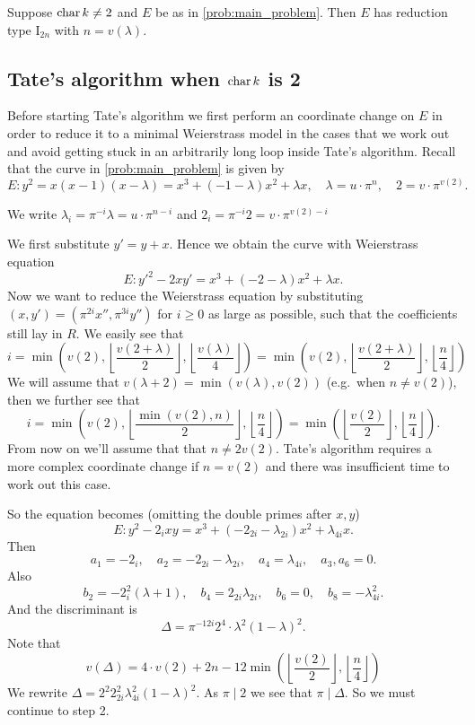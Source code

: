 \begin{proposition}
	Suppose $\operatorname{char} k \ne 2$ and $E$ be as in \cref{prob:main_problem}. 
	Then $E$ has reduction type $\mathrm I_{2n}$ with $n = v(\lambda)$. 
\end{proposition}

\subsection{Tate's algorithm when $\operatorname{char} k$ is 2}  \label{sec:char_k_is_2}

Before starting Tate's algorithm we first perform an coordinate change on $E$ in order to reduce it to a minimal Weierstrass model in the cases that we work out and avoid getting stuck in an arbitrarily long loop inside Tate's algorithm. 
Recall that the curve in \cref{prob:main_problem} is given by \[
	E: y^2 = x(x-1)(x-\lambda) = x^3 + (-1 -\lambda) x^2 + \lambda x, \quad \lambda = u \cdot \pi^{n}, \quad 2 = v\cdot \pi^{v(2)}
.\] 
\begin{notation}
	We write $\lambda_i = \pi^{-i} \lambda = u\cdot \pi ^{n -i}$ and $2_i = \pi^{-i}2 = v \cdot \pi^{v(2) - i}$
\end{notation}
We first substitute $y' = y + x$. 
Hence we obtain the curve with Weierstrass equation \[
	E: y'^2 - 2xy' = x^3 + (-2-\lambda) x^2 + \lambda x
.\] 
Now we want to reduce the Weierstrass equation by substituting $(x, y') = (\pi^{2i} x'', \pi^{3i}y'')$ for $i \ge 0$ as large as possible, such that the coefficients still lay in $R$. 
We easily see that \[
	i =  \min\left(v(2), \left\lfloor \frac{v(2 + \lambda)}{2} \right\rfloor,  \left\lfloor \frac{v(\lambda)}{4} \right\rfloor\right) = \min\left(v(2), \left\lfloor \frac{v(2 + \lambda)}{2} \right\rfloor,  \left\lfloor \frac{n}{4} \right\rfloor\right) 
\]
We will assume that $v(\lambda + 2) = \min(v(\lambda), v(2))$ (e.g.\ when $n \ne v(2)$), then we further see that \[
	i = \min\left(v(2), \left\lfloor \frac{\min (v(2), n)}{2} \right\rfloor,  \left\lfloor \frac{n}{4} \right\rfloor\right)  = \min\left(\left\lfloor \frac{v(2)}{2}\right\rfloor, \left\lfloor \frac{n}{4} \right\rfloor \right)
.\] 
From now on we'll assume that that $n \ne 2v(2)$. 
Tate's algorithm requires a more complex coordinate change if $n = v(2)$ and there was insufficient time to work out this case. 

So the equation becomes (omitting the double primes after $x, y$) \[
	E: y^2 - 2_i xy = x^3 + (-2_{2i} - \lambda_{2i})x^2 + \lambda_{4i}x
.\] 
Then \[
a_1 = -2_i, \quad a_2 = -2_{2i} - \lambda_{2i}, \quad a_4 =  \lambda_{4i}, \quad a_3, a_6 = 0 
.\] 
Also 
\[
	b_2 = -2_{i}^2 (\lambda + 1), \quad b_4 = 2_{2i}\lambda_{2i}, \quad b_6 = 0,\quad  b_8 = -\lambda_{4i}^2
.\] 
And the discriminant is \[
	\Delta = \pi^{-12i} 2^{4}\cdot \lambda^2(1 - \lambda)^2
.\] 
Note that \[
	v(\Delta) = 4\cdot v(2)+ 2n - 12 \min\left(\left\lfloor \frac{v(2)}{2}\right\rfloor, \left\lfloor \frac{n}{4} \right\rfloor \right)
\]
We rewrite $\Delta = 2^{2} 2_{2i}^2 \lambda_{4i}^2 (1- \lambda)^2$. 
As $\pi\mid 2$ we see that $\pi \mid \Delta$. 
So we must continue to step 2.

